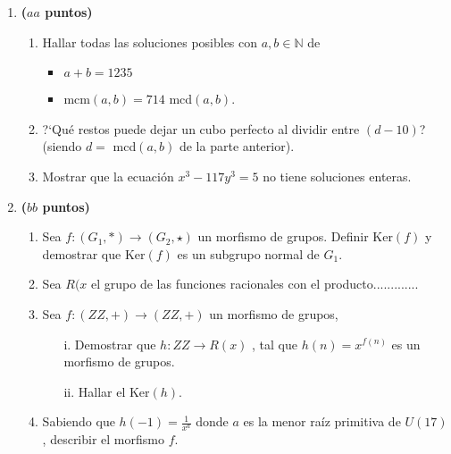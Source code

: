 \documentclass{article}
\newcommand{\Z}{\mbox{$Z\!\!\!Z$}}
\theoremstyle{definition}
\begin{document}
\begin{enumerate}

\vspace{2mm}

\item\textbf{($aa$ puntos)}
\begin{enumerate}
\item Hallar todas las soluciones posibles con $a,b \in \mathbb{N}$ de
  \begin{itemize} 
    \item $a+b = 1235$
    \item mcm$(a,b) = 714$ mcd$(a,b).$
\end{itemize}
  \item ?`Qu\'e restos puede dejar un cubo perfecto al dividir entre $(d-10)$? (siendo $d=$ mcd$(a,b)$ de la parte anterior).
  \item Mostrar que la ecuaci\'on $x^3-117y^3=5$ no tiene soluciones enteras.
\end{enumerate}

\vspace{2mm}

\item
\textbf{($bb$ puntos)}
\begin{enumerate}
  \item Sea $f: (G_1, *) \longrightarrow (G_2, \star)$ un morfismo de grupos. Definir Ker$(f)$ y demostrar que Ker$(f)$ es un subgrupo normal de $G_1$.
  
  \item  Sea $R(x$ el grupo de las funciones racionales con el producto.............

  \item Sea $f: (\Z, +) \longrightarrow (\Z, +)$ un morfismo de grupos, 
  \begin{enumerate}
    \item[i.] Demostrar que $h: \Z \longrightarrow R(x)$ , tal que $h(n) = x^{f(n)}$ es un morfismo de grupos.
    \item[ii.] Hallar el Ker$(h)$.
  \end{enumerate}
  \item  Sabiendo que $h(-1) = \frac{1}{x^{a}}$ donde $a$ es la menor ra\'iz primitiva de $U(17)$, describir el morfismo $f$.
\end{enumerate}


\end{enumerate}
\end{document}
